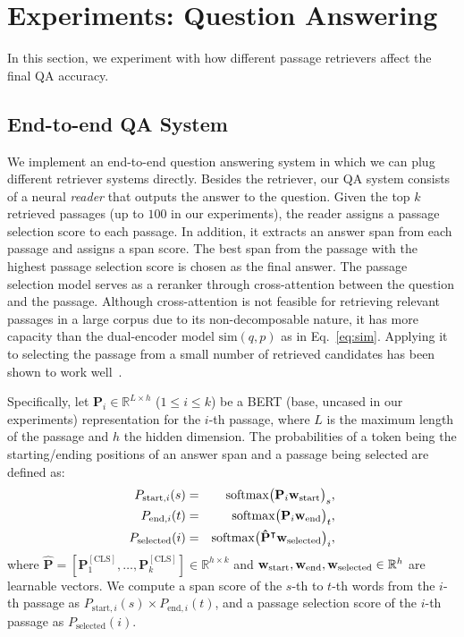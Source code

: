 



\section{Experiments: Question Answering}
\label{sec:exp-qa}

In this section, we experiment with how different passage retrievers affect the final QA accuracy.

\subsection{End-to-end QA System}

We implement an end-to-end question answering system in which we can plug different retriever systems directly. 
Besides the retriever, our QA system consists of a neural \textit{reader} that outputs the answer to the question.
Given the top $k$ retrieved passages (up to $100$ in our experiments), the reader assigns a passage selection score to each passage.  
In addition, it extracts an answer span from each passage and assigns a span score.
The best span from the passage with the highest passage selection score is chosen as the final answer.
The passage selection model serves as a reranker through cross-attention between the question and the passage. 
Although cross-attention is not feasible for retrieving relevant passages in a large corpus due to its non-decomposable nature, it has more capacity than the dual-encoder model $\mathrm{sim}(q,p)$ as in Eq.~\eqref{eq:sim}. Applying it to selecting the passage from a small number of retrieved candidates has been shown to work well~\cite{wang2019multi, wang2018r, lin2018denoising}.

Specifically, let $\mathbf{P}_{i} \in \mathbb{R}^{L \times h}$ ($1 \leq i \leq k$) be a BERT (base, uncased in our experiments) representation for the $i$-th passage, where $L$ is the maximum length of the passage and $h$ the hidden dimension.
The probabilities of a token being the starting/ending positions of an answer span and a passage being selected are defined as:
\begin{eqnarray}
    P_{\textrm{start},i}(s)  &=& \mathrm{softmax} \big( \mathbf{P}_{i} \mathbf{w}_\textrm{start}\big)_s, \\
    P_{\textrm{end},i}(t) &=& \mathrm{softmax} \big( \mathbf{P}_{i} \mathbf{w}_\textrm{end}\big)_t, \\
    P_\textrm{selected}(i) &=& \mathrm{softmax} \big( \mathbf{\hat{P}}^{\intercal} \mathbf{w}_\mathrm{selected}  \big)_i,
\end{eqnarray} where $\mathbf{\hat{P}} = [\mathbf{P}_1^{\mathrm{[CLS]}}, \ldots, \mathbf{P}_k^{\mathrm{[CLS]}}] \in \mathbb{R}^{h \times k}$ and $\mathbf{w}_\textrm{start}, \mathbf{w}_\textrm{end},\mathbf{w}_\mathrm{selected} \in \mathbb{R}^{h}$ are learnable vectors. 
We compute a span score of the $s$-th to $t$-th words from the $i$-th passage as $P_{\textrm{start},i}(s) \times P_{\textrm{end},i}(t)$, and a passage selection score of the $i$-th passage as $P_\textrm{selected}(i)$.

